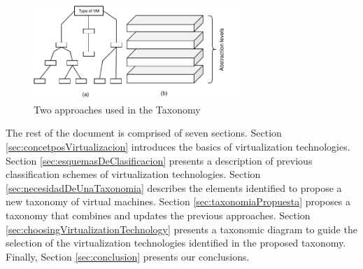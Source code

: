 	\begin{figure}[H]
		\centering
		\includegraphics[width=8cm]{images/TwoApproaches.pdf}
		\vspace{-0.2cm}
		\caption{Two approaches used in the Taxonomy}
		\label{fig:twoApproaches}
	\end{figure}	
	
	The rest of the document is comprised of seven sections. Section \ref{sec:concetposVirtualizacion} introduces the basics of virtualization technologies.  Section \ref{sec:esquemasDeClasificacion} presents a description of previous classification schemes of virtualization technologies.  Section \ref{sec:necesidadDeUnaTaxonomia} describes the elements identified to propose a new taxonomy of virtual machines. Section \ref{sec:taxonomiaPropuesta} proposes a taxonomy that combines and updates the previous approaches. Section \ref{sec:choosingVirtualizationTechnology} presents a taxonomic diagram to guide the selection of the virtualization technologies identified in the proposed taxonomy.  Finally, Section \ref{sec:conclusion} presents our conclusions.
	